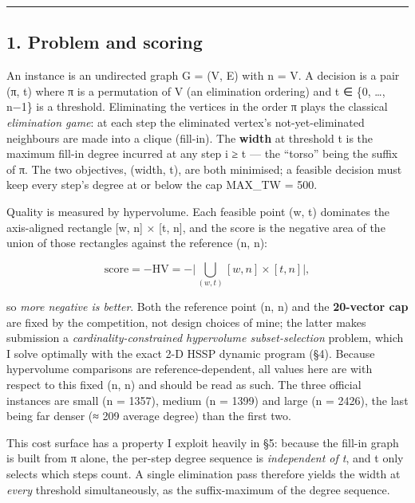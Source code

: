 \documentclass[
  11pt,
]{article}
\begin{document}
\begin{center}\rule{0.5\linewidth}{0.5pt}\end{center}

\hypertarget{problem-and-scoring}{%
\subsection{1. Problem and scoring}\label{problem-and-scoring}}

An instance is an undirected graph G = (V, E) with n =
\textbar V\textbar. A decision is a pair (π, t) where π is a permutation
of V (an elimination ordering) and t ∈ \{0, \ldots, n−1\} is a
threshold. Eliminating the vertices in the order π plays the classical
\emph{elimination game}: at each step the eliminated vertex's
not-yet-eliminated neighbours are made into a clique (fill-in). The
\textbf{width} at threshold t is the maximum fill-in degree incurred at
any step i ≥ t --- the ``torso'' being the suffix of π. The two
objectives, (width, t), are both minimised; a feasible decision must
keep every step's degree at or below the cap MAX\_TW = 500.

Quality is measured by hypervolume. Each feasible point (w, t) dominates
the axis-aligned rectangle {[}w, n{]} × {[}t, n{]}, and the score is the
negative area of the union of those rectangles against the reference (n,
n):

\[\text{score} = -\mathrm{HV} = -\Big|\bigcup_{(w,t)} [w,n]\times[t,n]\Big|,\]

so \emph{more negative is better}. Both the reference point (n, n) and
the \textbf{20-vector cap} are fixed by the competition, not design
choices of mine; the latter makes submission a
\emph{cardinality-constrained hypervolume subset-selection} problem,
which I solve optimally with the exact 2-D HSSP dynamic program (§4).
Because hypervolume comparisons are reference-dependent, all values here
are with respect to this fixed (n, n) and should be read as such. The
three official instances are small (n = 1357), medium (n = 1399) and
large (n = 2426), the last being far denser (≈ 209 average degree) than
the first two.

This cost surface has a property I exploit heavily in §5: because the
fill-in graph is built from π alone, the per-step degree sequence is
\emph{independent of t}, and t only selects which steps count. A single
elimination pass therefore yields the width at \emph{every} threshold
simultaneously, as the suffix-maximum of the degree sequence.
\end{document}
